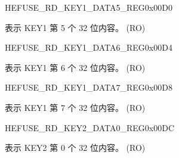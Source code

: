 \begin{register}{H}{EFUSE\_RD\_KEY1\_DATA5\_REG}{0x{}00D0}\label{regdesc:EFUSERDKEY1DATA5REG}
%
\regnewline%
\begin{regdesc}\begin{reglist}
\label{fielddesc:EFUSEKEY1DATA5}\item [EFUSE\_KEY1\_DATA5] 表示 KEY1 第 5 个 32 位内容。 (RO)
\end{reglist}\end{regdesc}
\end{register}


\begin{register}{H}{EFUSE\_RD\_KEY1\_DATA6\_REG}{0x{}00D4}\label{regdesc:EFUSERDKEY1DATA6REG}
%
\regnewline%
\begin{regdesc}\begin{reglist}
\label{fielddesc:EFUSEKEY1DATA6}\item [EFUSE\_KEY1\_DATA6] 表示 KEY1 第 6 个 32 位内容。 (RO)
\end{reglist}\end{regdesc}
\end{register}


\begin{register}{H}{EFUSE\_RD\_KEY1\_DATA7\_REG}{0x{}00D8}\label{regdesc:EFUSERDKEY1DATA7REG}
%
\regnewline%
\begin{regdesc}\begin{reglist}
\label{fielddesc:EFUSEKEY1DATA7}\item [EFUSE\_KEY1\_DATA7] 表示 KEY1 第 7 个 32 位内容。 (RO)
\end{reglist}\end{regdesc}
\end{register}


\begin{register}{H}{EFUSE\_RD\_KEY2\_DATA0\_REG}{0x{}00DC}\label{regdesc:EFUSERDKEY2DATA0REG}
%
\regnewline%
\begin{regdesc}\begin{reglist}
\label{fielddesc:EFUSEKEY2DATA0}\item [EFUSE\_KEY2\_DATA0] 表示 KEY2 第 0 个 32 位内容。 (RO)
\end{reglist}\end{regdesc}
\end{register}


